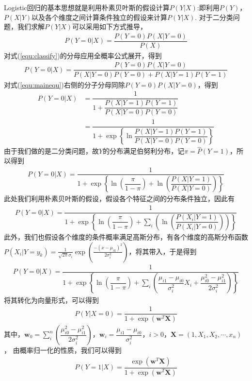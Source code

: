 \documentclass{hitreport}
\begin{document}
Logistic回归的基本思想就是利用朴素贝叶斯的假设计算$P\left(Y|X\right)$:即利用$P\left(Y\right)$，$P\left(X|Y\right)$以及各个维度之间计算条件独立的假设来计算$P\left(Y|X\right)$.
对于二分类问题，我们求解$P\left(Y|X\right)$可以采用如下方式推导，
\begin{align}\label{equ:classify}
P\left(Y=0|X\right) = \dfrac{P\left(Y=0\right)P\left(X|Y=0\right)}{P\left(X\right)}
\end{align}
对式(\ref{equ:classify})的分母应用全概率公式展开，得到
\begin{align}\label{equ:mainequ}
P\left(Y=0|X\right) = \dfrac{P\left(Y=0\right)P\left(X|Y=0\right)}{P\left(X|Y=0\right)P\left(Y=0\right)+P\left(X|Y=1\right)P\left(Y=1\right)}
\end{align}
对式(\ref{equ:mainequ})右侧的分子分母同除$P\left(Y=0\right)P\left(X|Y=0\right)$，得到
\begin{align}
P\left(Y=0|X\right) &= \dfrac{1}{1+\dfrac{P\left(X|Y=1\right)P\left(Y=1\right)}{P\left(X|Y=0\right)P\left(Y=0\right)}}\\
&=\dfrac{1}{1+\exp\left\{\ln \dfrac{P\left(X|Y=1\right)P\left(Y=1\right)}{P\left(X|Y=0\right)P\left(Y=0\right)}\right\}}
\end{align}
由于我们做的是二分类问题，故$Y$的分布满足伯努利分布，记$\pi = \hat{P}\left( Y=1 \right) $，所以得到
\begin{align}
P\left(Y=0|X\right) = \dfrac{1}{1+\exp\left\{\ln\left(\dfrac{\pi}{1-\pi}\right) +\ln \left(\dfrac{P\left(X|Y=1\right)}{P\left(X|Y=0\right)}\right)\right\}}
\end{align}
此处我们利用朴素贝叶斯的假设，假设各个特征之间的分布条件独立，因此有
\begin{align}
P\left(Y=0|X\right) = \dfrac{1}{1+\exp\left\{\ln\left(\dfrac{\pi}{1-\pi}\right) +\sum_{i}\left(\ln \left(\dfrac{P\left(X_i|Y=1\right)}{P\left(X_i|Y=0\right)}\right)\right)\right\}}
\end{align}
此外，我们也假设各个维度的条件概率满足高斯分布，有各个维度的高斯分布函数$P\left(X_i|Y=y_k\right) = \frac{1}{\sqrt{2\pi}\sigma_i} \exp \left(\frac{-\left(x-\mu_{ik}\right)^2}{2\sigma_i^2}\right)$，将其带入，于是得到
\begin{align}
P\left(Y=0|X\right) = \dfrac{1}{1+\exp\left\{\ln\left(\dfrac{\pi}{1-\pi}\right) +\sum_{i}\left(\dfrac{\mu_{i1}-\mu_{i0}}{\sigma_i^2}X_i+\dfrac{\mu_{i0}^2-\mu_{i1}^2}{2\sigma_i^2}\right)\right\}}
\end{align}
将其转化为向量形式，可以得到
\begin{align}
P\left(Y|X=0\right) = \dfrac{1}{1+\exp\left(\boldsymbol{w}^T\boldsymbol{X}\right)}
\end{align}
其中，$\boldsymbol{w}_0 = \sum\limits_{i}^{n}\left(\dfrac{\mu_{i0}^2-\mu_{i1}^2}{2\sigma_i^2}\right)$，$\boldsymbol{w}_i = \dfrac{\mu_{i1}-\mu_{i0}}{\sigma_i^2}$，$i>0$，$\boldsymbol{X} = \left(1,X_1,X_2,\cdots,x_n\right)$，
由概率归一化的性质，我们可以得到
\begin{align}
P\left(Y=1|X\right) = \dfrac{\exp\left(\boldsymbol{w}^T\boldsymbol{X}\right)}{1+\exp\left(\boldsymbol{w}^T\boldsymbol{X}\right)}
\end{align}
\end{document}
